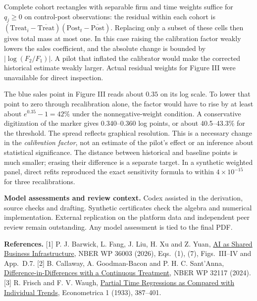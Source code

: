 \documentclass[11pt,a4paper]{article}
\begin{document}
Complete cohort rectangles with separable firm and time weights suffice for $q_j\ge0$ on control-post observations: the residual within each cohort is $(\mathrm{Treat}_i-\overline{\mathrm{Treat}})(\mathrm{Post}_t-\overline{\mathrm{Post}})$. Replacing only a subset of these cells then gives total mass at most one. In this case raising the calibration factor weakly lowers the sales coefficient, and the absolute change is bounded by $|\log(F_2/F_1)|$. A pilot that inflated the calibrator would make the corrected historical estimate weakly larger. Actual residual weights for Figure III were unavailable for direct inspection.

The blue sales point in Figure III reads about $0.35$ on its log scale. To lower that point to zero through recalibration alone, the factor would have to rise by at least about $e^{0.35}-1=42\%$ under the nonnegative-weight condition. A conservative digitization of the marker gives 0.340--0.360 log points, or about 40.5--43.3\% for the threshold. The spread reflects graphical resolution. This is a necessary change in the \emph{calibration factor}, not an estimate of the pilot's effect or an inference about statistical significance. The distance between historical and baseline points is much smaller; erasing their difference is a separate target. In a synthetic weighted panel, direct refits reproduced the exact sensitivity formula to within $4\times10^{-15}$ for three recalibrations.

\small
\textbf{Model assessments and review context.} Codex assisted in the derivation, source checks and drafting. Synthetic certificates check the algebra and numerical implementation. External replication on the platform data and independent peer review remain outstanding. Any model assessment is tied to the final PDF.

\textbf{References.}
[1] P. J. Barwick, L. Fang, J. Liu, H. Xu and Z. Yuan, \href{https://www.nber.org/papers/w36003}{AI as Shared Business Infrastructure}, NBER WP 36003 (2026), Eqs.~(1), (7), Figs.~III--IV and App.~D.7.
[2] B. Callaway, A. Goodman-Bacon and P. H. C. Sant'Anna, \href{https://www.nber.org/papers/w32117}{Difference-in-Differences with a Continuous Treatment}, NBER WP 32117 (2024).
[3] R. Frisch and F. V. Waugh, \href{https://doi.org/10.2307/1907330}{Partial Time Regressions as Compared with Individual Trends}, Econometrica 1 (1933), 387--401.
\end{document}
